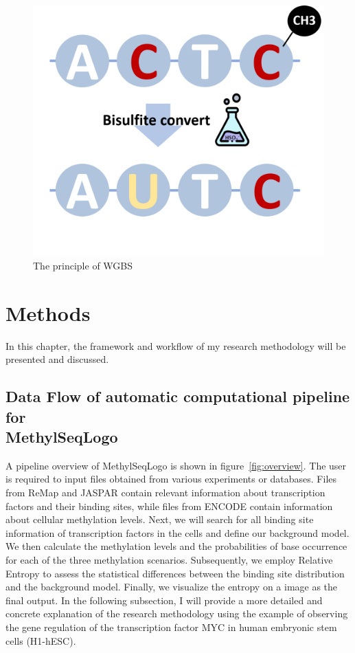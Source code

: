 \documentclass{PHlab-thesis}
\begin{document}
\begin{figure}[H]
	\centering
	\includegraphics[scale=0.65]{figures/wgbs.png}
	\caption{The principle of WGBS}
	\label{fig:wgbs} %
\end{figure}

\chapter{Methods}
In this chapter, the framework and workflow of my research methodology will be presented and discussed.
\section[Flow of automatic computational pipeline for MethylSeqLogo]{Data Flow of automatic computational pipeline for\\MethylSeqLogo}
A pipeline overview of MethylSeqLogo is shown in figure~\ref{fig:overview}.
The user is required to input files obtained from various experiments or databases. Files from ReMap and JASPAR contain relevant information about transcription factors and their binding sites, while files from ENCODE contain information about cellular methylation levels. Next, we will search for all binding site information of transcription factors in the cells and define our background model. We then calculate the methylation levels and the probabilities of base occurrence for each of the three methylation scenarios. Subsequently, we employ Relative Entropy to assess the statistical differences between the binding site distribution and the background model. Finally, we visualize the entropy on a image as the final output. In the following subsection, I will provide a more detailed and concrete explanation of the research methodology using the example of observing the gene regulation of the transcription factor MYC in human embryonic stem cells (H1-hESC).
\end{document}
